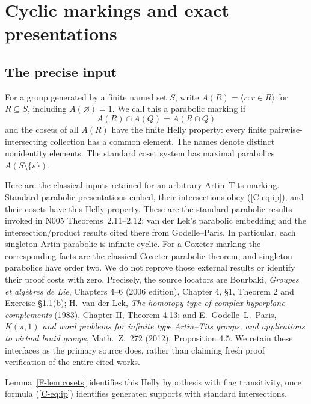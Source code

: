 \section{Cyclic markings and exact presentations}\label{sec:cyclic}
\subsection{The precise input}
For a group generated by a finite named set $S$, write
$A(R)=\langle r:r\in R\rangle$ for $R\subseteq S$, including
$A(\varnothing)=1$. We call this a parabolic marking if
\begin{equation}\label{C-eq:ip}
 A(R)\cap A(Q)=A(R\cap Q)
\end{equation}
and the cosets of all $A(R)$ have the finite Helly property: every finite
pairwise-intersecting collection has a common element. The names denote
distinct nonidentity elements. The standard coset system has maximal
parabolics $A(S\setminus\{s\})$.

Here are the classical inputs retained for an arbitrary Artin--Tits
marking. Standard parabolic presentations embed, their intersections obey
(\ref{C-eq:ip}), and their cosets have this Helly property. These are the
standard-parabolic results invoked in N005 Theorems~2.11--2.12:
van der Lek's parabolic embedding and the intersection/product results
cited there from Godelle--Paris. In particular, each singleton Artin
parabolic is infinite cyclic. For a Coxeter marking the corresponding
facts are the classical Coxeter parabolic theorem, and singleton
parabolics have order two. We do not reprove those external
results or identify their proof costs with zero.
Precisely, the source locators are Bourbaki, \emph{Groupes et alg\`ebres
de Lie}, Chapters 4--6 (2006 edition), Chapter 4, \S1, Theorem 2
and Exercise \S1.1(b); H.~van der Lek, \emph{The homotopy type of
complex hyperplane complements} (1983), Chapter II, Theorem 4.13;
and E.~Godelle--L.~Paris, \emph{$K(\pi,1)$ and word problems for
infinite type Artin--Tits groups, and applications to virtual braid
groups}, Math.~Z.~272 (2012), Proposition 4.5. We retain these
interfaces as the primary source does, rather than claiming fresh
proof verification of the entire cited works.

Lemma~\ref{F-lem:cosets} identifies this Helly hypothesis with flag transitivity, once formula (\ref{C-eq:ip}) identifies generated supports with standard intersections.

